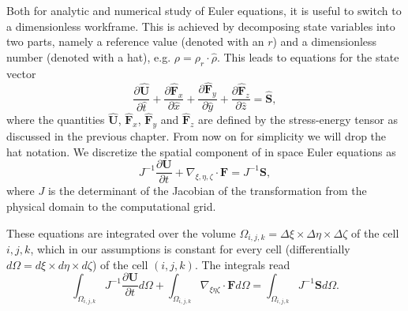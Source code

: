 Both for analytic and numerical study of Euler equations, it is useful to switch to a dimensionless workframe. This is achieved by decomposing state variables into two parts, namely a reference value (denoted with an $r$) and a dimensionless number (denoted with a hat), e.g. $\rho = \rho_r \cdot \hat{\rho}$. This leads to equations for the state vector 
\begin{equation}
\frac{\partial \mathbf{\hat{U}}}{\partial \hat{t}} + \frac{\partial \mathbf{\hat{F}}_x}{\partial \hat{x}} + \frac{\partial \mathbf{\hat{F}}_y}{\partial \hat{y}} + \frac{\partial \mathbf{\hat{F}}_z}{\partial \hat{z}} = \mathbf{\hat{S}},
\end{equation}
where the quantities $\mathbf{\hat{U}}$, $\mathbf{\hat{F}}_x$, $\mathbf{\hat{F}}_y$ and $\mathbf{\hat{F}}_z$ are defined by the stress-energy tensor as discussed in the previous chapter. From now on for simplicity we will drop the hat notation. We discretize the spatial component of in space Euler equations as 
\begin{equation}
J^{-1}\frac{\partial \mathbf{U}}{\partial t} + \nabla_{\xi, \eta, \zeta} \cdot \mathbf{F} = J^{-1} \mathbf{S},
\end{equation}
where $J$ is the determinant of the Jacobian of the transformation from the physical domain to the computational grid.

These equations are integrated over the volume $\Omega_{i, j, k} = \Delta \xi \times \Delta \eta \times \Delta \zeta $ of the cell $i, j, k$, which in our assumptions is constant for every cell (differentially $d \Omega = d \xi \times d \eta \times d \zeta$) of the cell $(i, j, k)$. The integrals read
\begin{equation}
	\int_{\Omega_{i, j, k}} J^{-1} \frac{\partial \mathbf{U}}{\partial t} d \Omega + \int_{\Omega_{i, j, k}} \nabla_{\xi \eta \zeta} \cdot \mathbf{F} d\Omega = \int_{\Omega_{i, j, k}} J^{-1} \mathbf{S} d \Omega.
\end{equation}

